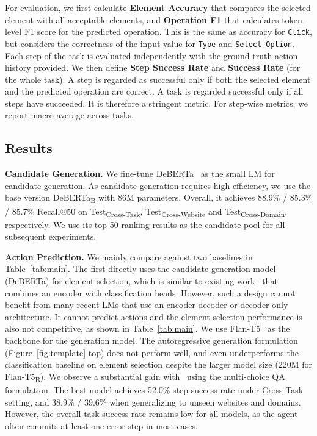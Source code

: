 For evaluation, we first calculate \textbf{Element Accuracy} that compares the selected element with all acceptable elements, and \textbf{Operation F1} that calculates token-level F1 score for the predicted operation. This is the same as accuracy for \texttt{Click}, but considers the correctness of the input value for \texttt{Type} and \texttt{Select Option}. Each step of the task is evaluated independently with the ground truth action history provided. We then define \textbf{Step Success Rate} and \textbf{Success Rate} (for the whole task). A step is regarded as successful only if both the selected element and the predicted operation are correct. A task is regarded successful only if all steps have succeeded. It is therefore a stringent metric. For step-wise metrics, we report macro average across tasks.



\subsection{Results}
\noindent\textbf{Candidate Generation.}
We fine-tune DeBERTa~\cite{deberta} as the small LM for candidate generation. As candidate generation requires high efficiency, we use the base version DeBERTa\textsubscript{B} with \num{86}M parameters. Overall, it achieves \num{88.9}\% / \num{85.3}\% / \num{85.7}\% Recall@\num{50} on  Test\textsubscript{Cross-Task}, Test\textsubscript{Cross-Website} and Test\textsubscript{Cross-Domain}, respectively. We use its top-\num{50} ranking results as the candidate pool for all subsequent experiments. 

\noindent\textbf{Action Prediction.}
We mainly compare against two baselines in Table~\ref{tab:main}.
The first directly uses the candidate generation model (DeBERTa) for element selection, which is similar to existing work~\cite{sunMETAGUIMultimodalConversational2022, gur2023understanding} that combines an encoder with classification heads. However, such a design cannot benefit from many recent LMs that use an encoder-decoder or decoder-only architecture.
It cannot predict actions and the element selection performance is also not competitive, as shown in Table~\ref{tab:main}.
We use Flan-T5~\cite{flant5} as the backbone for the generation model.
The autoregressive generation formulation (Figure~\ref{fig:template} top) does not perform well, and even underperforms the classification baseline on element selection despite the larger model size (\num{220}M for Flan-T5\textsubscript{B}).
We observe a substantial gain with \model\ using the multi-choice QA formulation. The best model achieves \num{52.0}\% step success rate under Cross-Task setting, and \num{38.9}\% / \num{39.6}\% when generalizing to unseen websites and domains.
However, the overall task success rate remains low for all models, as the agent often commits at least one error step in most cases.

